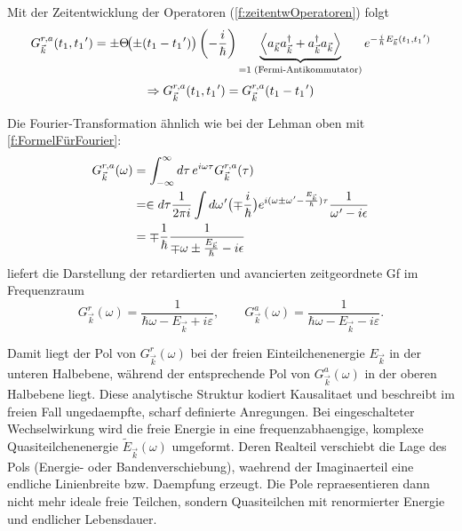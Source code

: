 Mit der Zeitentwicklung der Operatoren
(\autoref{f:zeitentwOperatoren}) folgt
\begin{equation}
  G^{r,a}_{\vec k}(t_1,t_1\mkern1mu')
  = \pm\Theta\!\bigl(\pm(t_1-t_1\mkern1mu')\bigr)\left(-\frac{i}{\hbar}\right)
  \underbrace{\left\langle a_{\vec k}a^{\dagger}_{\vec k}+a^{\dagger}_{\vec k}a_{\vec k}\right\rangle}_{=1\;\text{(Fermi-Antikommutator)}}
  e^{-\frac{i}{\hbar}E_{\vec k}(t_1,t_1\mkern1mu')}
\end{equation}
\begin{equation}
  \Rightarrow G^{r,a}_{\vec k}(t_1,t_1\mkern1mu') = G^{r,a}_{\vec k}(t_1-t_1\mkern1mu')
\end{equation}

Die Fourier-Transformation ähnlich wie bei der
Lehman oben mit \autoref{f:FormelFürFourier}:
\begin{equation}
  \begin{aligned}
    G^{r,a}_{\vec k}(\omega) & =\int_{-\infty}^{\infty} d\tau\,e^{i\omega\tau}G^{r,a}_{\vec k}(\tau)                                                                                                               \\
                             & = \in d\tau \frac{1}{2\pi i} \int d\omega\mkern1mu'\bigl(\mp\frac{i}{\hbar}\bigr)e^{i(\omega\pm\omega\mkern1mu'-\frac{E_{\vec k}}{\hbar})\tau} \frac{1}{\omega\mkern1mu'-i\epsilon} \\
                             & = \mp \frac 1 \hbar \frac{1}{\mp \omega \pm \frac{E_{\vec k}}{\hbar} - i\epsilon }
  \end{aligned}
\end{equation}
liefert die Darstellung der retardierten und avancierten zeitgeordnete Gf im Frequenzraum
\begin{equation}
  G^{r}_{\vec k}(\omega)=\frac{1}{\hbar\omega-E_{\vec k}+i\varepsilon},
  \qquad
  G^{a}_{\vec k}(\omega)=\frac{1}{\hbar\omega-E_{\vec k}-i\varepsilon}.
\end{equation}

Damit liegt der Pol von $G^r_{\vec k}(\omega)$
bei der freien Einteilchenenergie $E_{\vec k}$ in
der unteren Halbebene, während der entsprechende
Pol von $G^a_{\vec k}(\omega)$ in der oberen
Halbebene liegt. Diese analytische Struktur
kodiert Kausalitaet und beschreibt im freien Fall
ungedaempfte, scharf definierte Anregungen. Bei
eingeschalteter Wechselwirkung wird die freie
Energie in eine frequenzabhaengige, komplexe
Quasiteilchenenergie $\tilde E_{\vec k}(\omega)$
umgeformt. Deren Realteil verschiebt die Lage des
Pols (Energie- oder Bandenverschiebung), waehrend
der Imaginaerteil eine endliche Linienbreite bzw.
Daempfung erzeugt. Die Pole repraesentieren dann
nicht mehr ideale freie Teilchen, sondern
Quasiteilchen mit renormierter Energie und
endlicher Lebensdauer.

